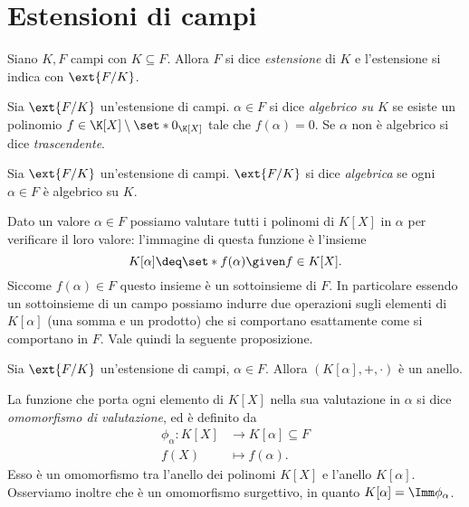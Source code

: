 \section{Estensioni di campi}

\begin{definition}
     Siano $K, F$ campi con $K \subseteq F$. Allora $F$ si dice \emph{estensione} di $K$ e l'estensione si indica con $\ext{F/K}$.
\end{definition}

\begin{definition}
     Sia $\ext{F/K}$ un'estensione di campi. $\alpha \in F$ si dice \emph{algebrico su $K$} se esiste un polinomio $f \in \K[X] \setminus \set*{0_{\K[X]}}$ tale che $f(\alpha) = 0$. Se $\alpha$ non è algebrico si dice \emph{trascendente}.
\end{definition}

\begin{definition}
     Sia $\ext{F/K}$ un'estensione di campi. $\ext{F/K}$ si dice \emph{algebrica} se ogni $\alpha \in F$ è algebrico su $K$.
\end{definition}

Dato un valore $\alpha \in F$ possiamo valutare tutti i polinomi di $K[X]$ in $\alpha$ per verificare il loro valore: l'immagine di questa funzione è l'insieme \[
    K[\alpha] \deq \set*{f(\alpha) \given f \in K[X]}.    
\] Siccome $f(\alpha) \in F$ questo insieme è un sottoinsieme di $F$. In particolare essendo un sottoinsieme di un campo possiamo indurre due operazioni sugli elementi di $K[\alpha]$ (una somma e un prodotto) che si comportano esattamente come si comportano in $F$. Vale quindi la seguente proposizione.

\begin{proposition}
    Sia $\ext{F/K}$ un'estensione di campi, $\alpha \in F$. Allora $(K[\alpha], +, \cdot)$ è un anello.
\end{proposition}

La funzione che porta ogni elemento di $K[X]$ nella sua valutazione in $\alpha$ si dice \emph{omomorfismo di valutazione}, ed è definito da \begin{align*}
    \phi_\alpha : K[X] &\to K[\alpha] \subseteq F\\   
    f(X) &\mapsto f(\alpha).
\end{align*} Esso è un omomorfismo tra l'anello dei polinomi $K[X]$ e l'anello $K[\alpha]$. Osserviamo inoltre che è un omomorfismo surgettivo, in quanto $K[\alpha] = \Imm \phi_\alpha$.

